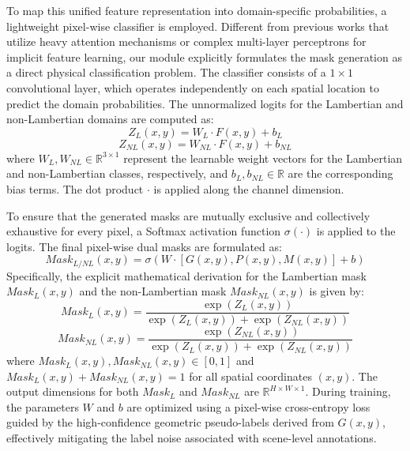 To map this unified feature representation into domain-specific probabilities, a lightweight pixel-wise classifier is employed. Different from previous works that utilize heavy attention mechanisms or complex multi-layer perceptrons for implicit feature learning, our module explicitly formulates the mask generation as a direct physical classification problem. The classifier consists of a $1 \times 1$ convolutional layer, which operates independently on each spatial location to predict the domain probabilities. The unnormalized logits for the Lambertian and non-Lambertian domains are computed as:
\begin{equation}
\label{eq:eq9}
Z_L(x,y) = W_L \cdot F(x,y) + b_L
\end{equation}
\begin{equation}
\label{eq:eq10}
Z_{NL}(x,y) = W_{NL} \cdot F(x,y) + b_{NL}
\end{equation}
where $W_L, W_{NL} \in \mathbb{R}^{3 \times 1}$ represent the learnable weight vectors for the Lambertian and non-Lambertian classes, respectively, and $b_L, b_{NL} \in \mathbb{R}$ are the corresponding bias terms. The dot product $\cdot$ is applied along the channel dimension.

To ensure that the generated masks are mutually exclusive and collectively exhaustive for every pixel, a Softmax activation function $\sigma(\cdot)$ is applied to the logits. The final pixel-wise dual masks are formulated as:
\begin{equation}
\label{eq:eq11}
Mask_{L/NL}(x,y) = \sigma(W \cdot [G(x,y), P(x,y), M(x,y)] + b)
\end{equation}
Specifically, the explicit mathematical derivation for the Lambertian mask $Mask_L(x,y)$ and the non-Lambertian mask $Mask_{NL}(x,y)$ is given by:
\begin{equation}
\label{eq:eq12}
Mask_L(x,y) = \frac{\exp(Z_L(x,y))}{\exp(Z_L(x,y)) + \exp(Z_{NL}(x,y))}
\end{equation}
\begin{equation}
\label{eq:eq13}
Mask_{NL}(x,y) = \frac{\exp(Z_{NL}(x,y))}{\exp(Z_L(x,y)) + \exp(Z_{NL}(x,y))}
\end{equation}
where $Mask_L(x,y), Mask_{NL}(x,y) \in [0, 1]$ and $Mask_L(x,y) + Mask_{NL}(x,y) = 1$ for all spatial coordinates $(x,y)$. The output dimensions for both $Mask_L$ and $Mask_{NL}$ are $\mathbb{R}^{H \times W \times 1}$. During training, the parameters $W$ and $b$ are optimized using a pixel-wise cross-entropy loss guided by the high-confidence geometric pseudo-labels derived from $G(x,y)$, effectively mitigating the label noise associated with scene-level annotations.

